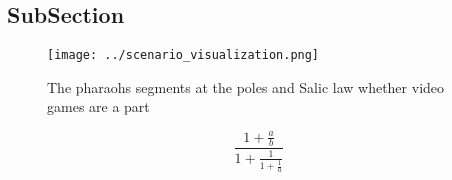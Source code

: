 \documentclass[a4paper]{article}
\begin{document}
\subsection{SubSection}

\begin{figure}
\centering
\texttt{[image: ../scenario\_visualization.png]}
\caption{The pharaohs segments at the poles and Salic law whether video games are a part
}
\end{figure}
 
\[ \frac{1+\frac{a}{b}}{1+\frac{1}{1+\frac{1}{a}}} \]
\end{document}

